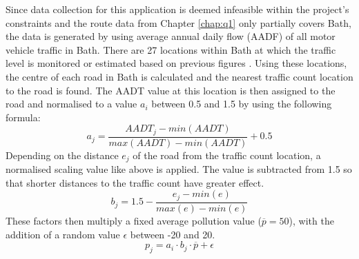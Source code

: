 \documentclass[11pt,twosided,a4paper]{report}
\begin{document}

Since data collection for this application is deemed infeasible within the project's constraints and the route data from Chapter \ref{chap:q1} only partially covers Bath, the data is generated by using average annual daily flow (AADF) of all motor vehicle traffic in Bath. There are 27 locations within Bath at which the traffic level is monitored or estimated based on previous figures \citep{dft2018traffic}. Using these locations, the centre of each road in Bath is calculated and the nearest traffic count location to the road is found. The AADT value at this location is then assigned to the road and normalised to a value $a_i$ between 0.5 and 1.5 by using the following formula:
\begin{equation}
a_j = \frac{AADT_j - min(AADT)}{max(AADT) - min(AADT)} + 0.5
\end{equation}
Depending on the distance $e_j$ of the road from the traffic count location, a normalised scaling value like above is applied. The value is subtracted from 1.5 so that shorter distances to the traffic count have greater effect.
\begin{equation}
b_j = 1.5 - \frac{e_j - min(e)}{max(e) - min(e)}
\end{equation}
These factors then multiply a fixed average pollution value ($\overline{p} = 50$), with the addition of a random value $\epsilon$ between -20 and 20.
\begin{equation}
p_j = a_i \cdot b_j \cdot \overline{p} + \epsilon
\end{equation}

\end{document}
